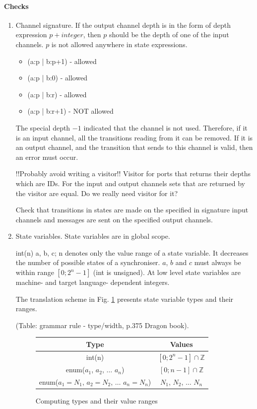   \paragraph{Checks}
\begin{enumerate}
\item Channel signature. If the output channel depth is in the form of depth expression $p+integer$, then $p$ should be the depth of one of the input channels. $p$ is not allowed anywhere in state expressions.
  \begin{itemize}
  \item (a:p | b:p+1) - allowed
  \item (a:p | b:0) - allowed
  \item (a:p | b:r) - allowed
  \item (a:p | b:r+1) - NOT allowed
  \end{itemize}
The special depth $-1$ indicated that the channel is not used. Therefore, if it is an input channel, all the transitions reading from it can be removed. If it is an output channel, and the transition that sends to this channel is valid, then an error must occur.

!!Probably avoid writing a visitor!! Visitor for ports that returns their depths which are IDs.
For the input and output channels sets that are returned by the visitor are equal.
Do we really need visitor for it?

Check that transitions in states are made on the specified in signature input channels and messages are sent on the specified output channels.

\item State variables.
State variables are in global scope.

int(n) a, b, c; n denotes only the value range of a state variable. It decreases the number of possible states of a synchroniser. $a$, $b$ and $c$ must always be within range $[0; 2^{n}-1]$ (int is unsigned). At low level state variables are machine- and target language- dependent integers.

The translation scheme in Fig. \ref{std} presents state variable types and their ranges.

(Table: grammar rule - type/width, p.375 Dragon book).
\begin{figure}[h!]
\centering
\begin{tabular}{|c|c|}
\hline
Type & Values\\
\hline
int(n) & $[0; 2^{n}-1] \cap \mathbb{Z}$\\
\hline
enum($a_1$, $a_2$, $\dots$ $a_n$) & $[0; n-1] \cap \mathbb{Z}$\\
\hline
enum($a_1=N_1$, $a_2=N_2$, $\dots$ $a_n=N_n$) & $N_1$, $N_2$, $\dots$ $N_n$\\
\hline
\end{tabular}
\caption{Computing types and their value ranges}
\label{std}
\end{figure}


\end{enumerate}
